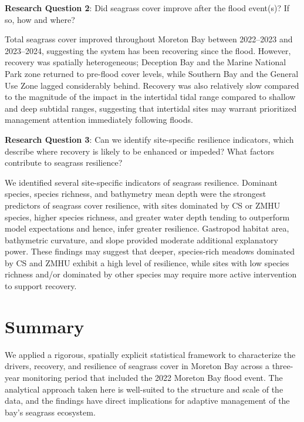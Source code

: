 \documentclass[
  letterpaper,
  DIV=11,
  numbers=noendperiod]{scrartcl}
\begin{document}
\textbf{Research Question 2}: Did seagrass cover improve after the flood
event(s)? If so, how and where?

Total seagrass cover improved throughout Moreton Bay between 2022--2023
and 2023--2024, suggesting the system has been recovering since the
flood. However, recovery was spatially heterogeneous; Deception Bay and
the Marine National Park zone returned to pre-flood cover levels, while
Southern Bay and the General Use Zone lagged considerably behind.
Recovery was also relatively slow compared to the magnitude of the
impact in the intertidal tidal range compared to shallow and deep
subtidal ranges, suggesting that intertidal sites may warrant
prioritized management attention immediately following floods.

\textbf{Research Question 3}: Can we identify site-specific resilience
indicators, which describe where recovery is likely to be enhanced or
impeded? What factors contribute to seagrass resilience?

We identified several site-specific indicators of seagrass resilience.
Dominant species, species richness, and bathymetry mean depth were the
strongest predictors of seagrass cover resilience, with sites dominated
by CS or ZMHU species, higher species richness, and greater water depth
tending to outperform model expectations and hence, infer greater
resilience. Gastropod habitat area, bathymetric curvature, and slope
provided moderate additional explanatory power. These findings may
suggest that deeper, species-rich meadows dominated by CS and ZMHU
exhibit a high level of resilience, while sites with low species
richness and/or dominated by other species may require more active
intervention to support recovery.

\section{Summary}\label{summary}

We applied a rigorous, spatially explicit statistical framework to
characterize the drivers, recovery, and resilience of seagrass cover in
Moreton Bay across a three-year monitoring period that included the 2022
Moreton Bay flood event. The analytical approach taken here is
well-suited to the structure and scale of the data, and the findings
have direct implications for adaptive management of the bay's seagrass
ecosystem.
\end{document}
